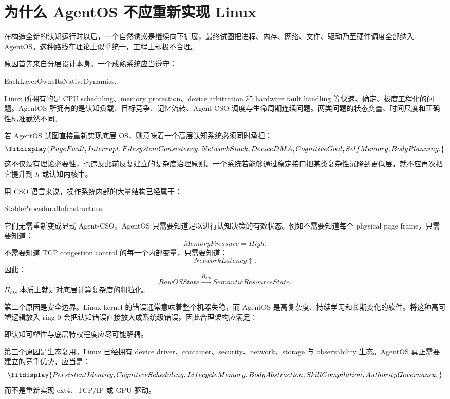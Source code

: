 \section{为什么 AgentOS 不应重新实现 Linux}

在构造全新的认知运行时以后，一个自然诱惑是继续向下扩展，最终试图把进程、内存、网络、文件、驱动乃至硬件调度全部纳入 AgentOS。这种路线在理论上似乎统一，工程上却极不合理。

原因首先来自分层设计本身。一个成熟系统应当遵守：
\begin{statementbox}
EachLayerOwnsItsNativeDynamics.
\end{statementbox}
Linux 所拥有的是 CPU scheduling、memory protection、device arbitration 和 hardware fault handling 等快速、确定、极度工程化的问题。AgentOS 所拥有的是认知负载、目标竞争、记忆流转、Agent-CSO 调度与生命周期连续问题。两类问题的状态变量、时间尺度和正确性标准截然不同。

若 AgentOS 试图直接重新实现底层 OS，则意味着一个高层认知系统必须同时承担：
\[
\fitdisplay{
PageFault,
Interrupt,
FilesystemConsistency,
NetworkStack,
DeviceDMA,
CognitiveGoal,
SelfMemory,
BodyPlanning.
}
\]
这不仅没有理论必要性，也违反此前反复建立的复杂度治理原则。一个系统若能够通过稳定接口把某类复杂性沉降到更低层，就不应再次把它提升到 $h$ 或认知内核中。

用 CSO 语言来说，操作系统内部的大量结构已经属于：
\begin{statementbox}
StableProceduralInfrastructure.
\end{statementbox}
它们无需重新变成显式 Agent-CSO。AgentOS 只需要知道足以进行认知决策的有效状态。例如不需要知道每个 physical page frame，只需要知道：
\[
MemoryPressure=High.
\]
不需要知道 TCP congestion control 的每一个内部变量，只需要知道：
\[
NetworkLatency\uparrow.
\]
因此：
\[
RawOSState
\xrightarrow{\Pi_{OS}}
SemanticResourceState.
\]
$\Pi_{OS}$ 本质上就是对底层计算复杂度的粗粒化。

第二个原因是安全边界。Linux kernel 的错误通常意味着整个机器失稳，而 AgentOS 是高复杂度、持续学习和长期变化的软件。将这种高可塑逻辑放入 ring 0 会把认知错误直接放大成系统级错误。因此合理架构应满足：
\begin{statementbox}
\centering
{}
\end{statementbox}
即认知可塑性与底层特权程度应尽可能解耦。

第三个原因是生态复用。Linux 已经拥有 device driver、container、security、network、storage 与 observability 生态。AgentOS 真正需要建立的竞争优势，应当是：
\[
\fitdisplay{
PersistentIdentity,
CognitiveScheduling,
LifecycleMemory,
BodyAbstraction,
SkillCompilation,
AuthorityGovernance,
}
\]
而不是重新实现 ext4、TCP/IP 或 GPU 驱动。

